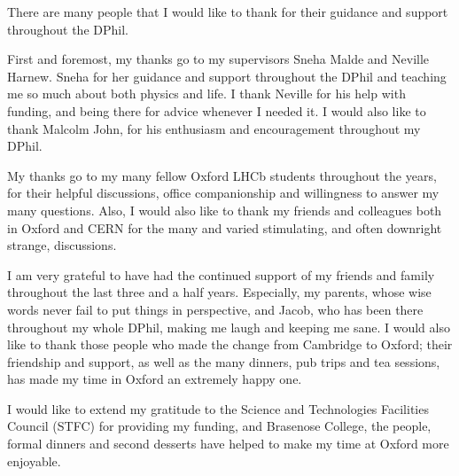 
There are many people that I would like to thank for their guidance and support throughout the DPhil. 

First and foremost, my thanks go to my supervisors Sneha Malde and Neville Harnew. Sneha for her guidance and support throughout the DPhil and teaching me so much about both physics and life. I thank Neville for his help with funding, and being there for advice whenever I needed it. I would also like to thank Malcolm John, for his enthusiasm and encouragement throughout my DPhil.

My thanks go to my many fellow Oxford LHCb students throughout the years, for their helpful discussions, office companionship and willingness to answer my many questions. Also, I would also like to thank my friends and colleagues both in Oxford and CERN for the many and varied stimulating, and often downright strange, discussions.

I am very grateful to have had the continued support of my friends and family throughout the last three and a half years. Especially, my parents, whose wise words never fail to put things in perspective, and Jacob, who has been there throughout my whole DPhil, making me laugh and keeping me sane. I would also like to thank those people who made the change from Cambridge to Oxford; their friendship and support, as well as the many dinners, pub trips and tea sessions, has made my time in Oxford an extremely happy one.

I would like to extend my gratitude to the Science and Technologies Facilities Council (STFC) for providing my funding, and Brasenose College, the people, formal dinners and second desserts have helped to make my time at Oxford more enjoyable.